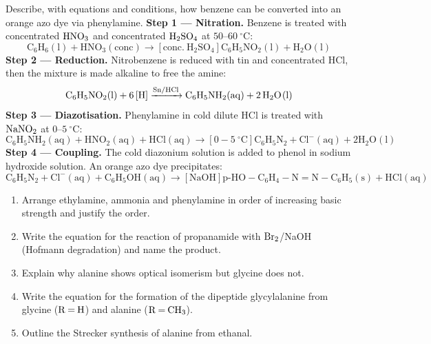 \documentclass[11pt]{article}
\begin{document}
\begin{exoresolu}
Describe, with equations and conditions, how benzene can be converted into an orange azo dye via phenylamine.
\tcblower
\textbf{Step 1 — Nitration.} Benzene is treated with concentrated $\ce{HNO3}$ and concentrated $\ce{H2SO4}$ at $50$--$\SI{60}{\ensuremath{{}^{\circ}\mathrm{C}}}$:
\[ \ensuremath{\mathrm{C_{6}H_{6}(l) + HNO_{3}(conc) \rightarrow [conc.\ H_{2}SO_{4}] C_{6}H_{5}NO_{2}(l) + H_{2}O(l)}} \]
\textbf{Step 2 — Reduction.} Nitrobenzene is reduced with tin and concentrated HCl, then the mixture is made alkaline to free the amine:
\[ \ce{C6H5NO2(l) + 6[H] ->[Sn/HCl] C6H5NH2(aq) + 2H2O(l)} \]
\textbf{Step 3 — Diazotisation.} Phenylamine in cold dilute HCl is treated with $\ce{NaNO2}$ at $0$--$\SI{5}{\ensuremath{{}^{\circ}\mathrm{C}}}$:
\[ \ensuremath{\mathrm{C_{6}H_{5}NH_{2}(aq) + HNO_{2}(aq) + HCl(aq) \rightarrow [0-5\ ^{\circ}C] C_{6}H_{5}N_{2}+Cl^{-}(aq) + 2H_{2}O(l)}} \]
\textbf{Step 4 — Coupling.} The cold diazonium solution is added to phenol in sodium hydroxide solution. An orange azo dye precipitates:
\[ \ensuremath{\mathrm{C_{6}H_{5}N_{2}+Cl^{-}(aq) + C_{6}H_{5}OH(aq) \rightarrow [NaOH] p\text{-}HO-C_{6}H_{4}-N=N-C_{6}H_{5}(s) + HCl(aq)}} \]
\end{exoresolu}

\begin{exercice}
\begin{enumerate}
\item Arrange ethylamine, ammonia and phenylamine in order of increasing basic strength and justify the order.
\item Write the equation for the reaction of propanamide with $\ce{Br2}$/NaOH (Hofmann degradation) and name the product.
\item Explain why alanine shows optical isomerism but glycine does not.
\item Write the equation for the formation of the dipeptide glycylalanine from glycine ($\ce{R = H}$) and alanine ($\ce{R = CH3}$).
\item Outline the Strecker synthesis of alanine from ethanal.
\end{enumerate}
\end{exercice}
\end{document}
